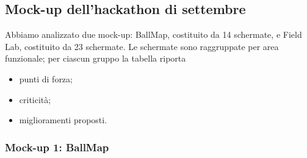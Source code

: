 \subsection{Mock-up dell'hackathon di settembre}
Abbiamo analizzato due mock-up: BallMap, costituito da 14 schermate, e Field Lab, costituito da 23 schermate. Le schermate sono raggruppate per area funzionale; per ciascun gruppo la tabella riporta
\begin{itemize}
    \item punti di forza;
    \item criticità;
    \item miglioramenti proposti.
\end{itemize} 
 

\subsubsection*{Mock-up 1: BallMap}
\begingroup
{}
